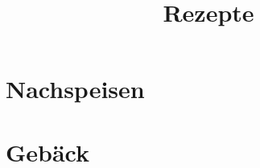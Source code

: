 \documentclass[12pt,a4paper]{report}
\begin{document}
\title{\bfseries\Huge Rezepte}
\maketitle
\tableofcontents

\chapter{Nachspeisen}


\chapter{Gebäck}






\appendix

\printindex[recipe]

\printindex[ingredient]
\end{document}
